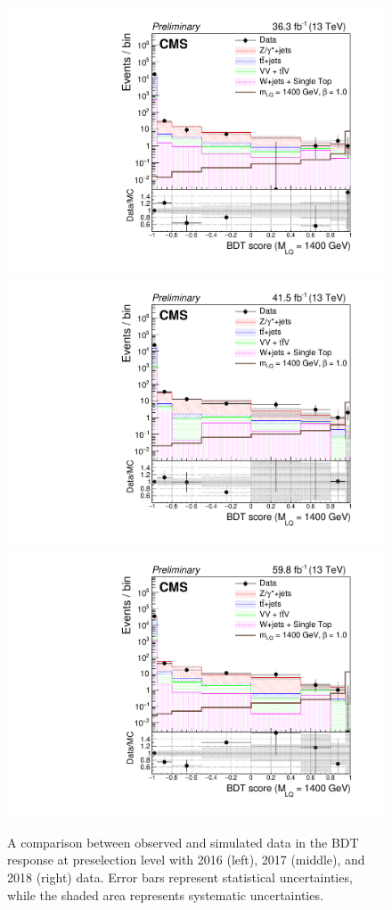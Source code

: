\begin{figure}[H]
    {\includegraphics[width=.32\textwidth]{Images/Analysis/Results_2016_Unblinded/Plots/Preselection/BasicLQ_uujj_LQToBMu_pair_uubj_BDT_discrim_M1400_standard.pdf}}
    {\includegraphics[width=.32\textwidth]{Images/Analysis/Results_2017_Unblinded/Plots/Preselection/BasicLQ_uujj_LQToBMu_pair_uubj_BDT_discrim_M1400_standard.pdf}}
    {\includegraphics[width=.32\textwidth]{Images/Analysis/Results_2018_Unblinded/Plots/Preselection/BasicLQ_uujj_LQToBMu_pair_uubj_BDT_discrim_M1400_standard.pdf}}
    \caption{A comparison between observed and simulated data in the BDT response at preselection level with 2016 (left), 2017 (middle), and 2018 (right) data. Error bars represent statistical uncertainties, while the shaded area represents systematic uncertainties.}
    \label{figapp:BDT1200to1400}
\end{figure}

